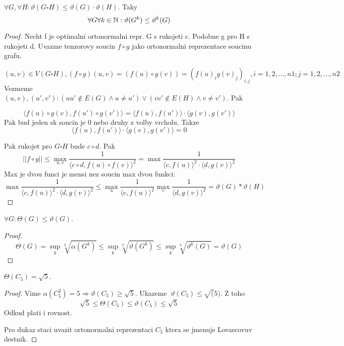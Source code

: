\begin{lemma}
	$\forall G, \forall H: \vartheta(G \square H) \leq \vartheta(G) \cdot \vartheta(H)$. Taky
	\[ \forall G \forall k \in \operatorname{\mathbb{N}}: \vartheta(G^k) \leq \vartheta^k(G) \]
\end{lemma}
\begin{proof}
	Necht f je optimalni ortonormalni repr. G s rukojeti c. Podobne g pro H s rukojeti d. Uvazme tenzorovy soucin $f \circ g$ jako ortonormalni reprezentace soucinu grafu.

	\[ (u, v) \in V(G \square H), (f \circ g) (u, v) = (f(u) \circ g(v)) = (f(u)_i g(v)_j)_{i, j}, i = 1, 2, ..., n1; j = 1,2, ..., n2\]
	Vezmeme $(u, v), (u', v'): (uu' \notin E(G) \land u \ne u') \lor (vv' \notin E(H) \land v \ne v') $. Pak

	\[ \langle f(u) \circ g(v), f(u') \circ g(v') \rangle = \langle f(u), f(u') \rangle \cdot \langle g(v), g(v') \rangle \]
	Pak bud jeden sk soucin je 0 nebo druhy z volby vrcholu. Takze
	\[ \langle f(u), f(u') \rangle \cdot \langle g(v), g(v') \rangle = 0 \]

	Pak rukojet pro $G \square H$ bude $c \circ d$. Pak
	\[ || f \circ g || \leq \max_{u, v} \frac{1}{\langle c \circ d, f(u) \circ f(v) \rangle^2} = \max \frac{1}{\langle c, f(u) \rangle^2 \cdot \langle d, g(v) \rangle^2} \]
	Max je dvou funci je mensi nez soucin max dvou funkci:
	\[ \max \frac{1}{\langle c, f(u) \rangle^2 \cdot \langle d, g(v) \rangle^2} \leq \max_u \frac{1}{\langle c, f(u) \rangle^2} \max_v \frac{1}{\langle d, g(v) \rangle^2} = \vartheta(G) * \vartheta(H) \]
\end{proof}

\begin{lemma}
	$\forall G : \Theta(G) \leq \vartheta(G)$.
\end{lemma}
\begin{proof}
	\[ \Theta(G) = \sup_k \sqrt[k]{\alpha(G^k)} \leq \sup_k \sqrt[k]{\vartheta(G^k)} \leq \sup_k \sqrt[k]{\vartheta^k(G)} = \vartheta(G) \]

\end{proof}

\begin{theorem}
	$ \Theta(C_5) = \sqrt{5}$.
\end{theorem}
\begin{proof}
	Vime $ \alpha(C_5^2) = 5 \Rightarrow \vartheta(C_5) \geq \sqrt{5} $. Ukazeme $\ \vartheta(C_5) \leq \sqrt(5)$. Z toho
	\[ \sqrt{5} \leq \Theta(C_5) \leq \vartheta(C_5) \leq \sqrt{5} \]
	Odkud plati i rovnost.

	Pro dukaz staci uvazit ortonormalni reprezentaci $C_5$ ktera se jmenuje Lovascovuv destnik.
\end{proof}

